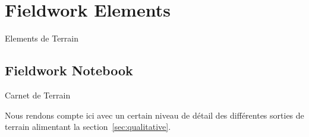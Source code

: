 




\section{Fieldwork Elements}{Elements de Terrain}


\subsection{Fieldwork Notebook}{Carnet de Terrain}

Nous rendons compte ici avec un certain niveau de détail des différentes sorties de terrain alimentant la section~\ref{sec:qualitative}.






